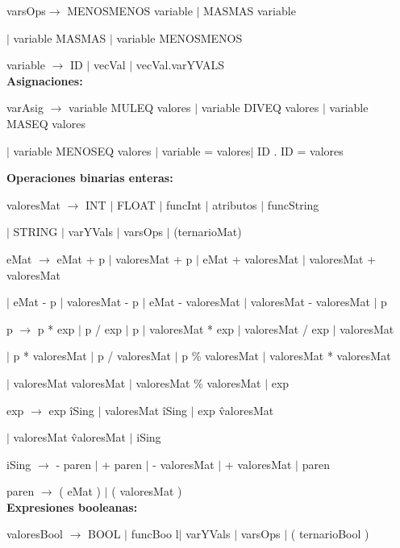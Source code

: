 varsOps$\rightarrow$ MENOSMENOS variable $|$ MASMAS variable

\hspace{15mm}$|$ variable MASMAS $|$ variable MENOSMENOS

variable $\rightarrow$ ID $|$ vecVal $|$ vecVal.varYVALS  \\

\textbf{Asignaciones:} 

  varAsig $\rightarrow$ variable MULEQ valores $|$ variable DIVEQ valores $|$ variable MASEQ valores
  
  \hspace{15mm}$|$ variable MENOSEQ valores $|$ variable = valores$|$ ID . ID = valores 



\textbf{Operaciones binarias enteras:} 

 valoresMat $\rightarrow$ INT $|$ FLOAT $|$ funcInt $|$ atributos $|$ funcString
 
  \hspace{15mm} $|$ STRING $|$ varYVals $|$ varsOps $|$ (ternarioMat)  
  
 
eMat $\rightarrow$ eMat + p $|$ valoresMat + p $|$ eMat + valoresMat $|$ valoresMat + valoresMat
  
  \hspace{15mm} $|$ eMat - p  $|$ valoresMat - p  $|$ eMat - valoresMat $|$ valoresMat - valoresMat $|$ p
  
 p $\rightarrow$ p * exp $|$ p / exp $|$ p  $|$ valoresMat * exp $|$ valoresMat / exp $|$ valoresMat 
 
   \hspace{15mm} $|$ p * valoresMat $|$ p / valoresMat $|$ p \% valoresMat $|$ valoresMat * valoresMat
   
   \hspace{15mm} $|$ valoresMat \/ valoresMat $|$ valoresMat \% valoresMat $|$ exp
    
 exp $\rightarrow$ exp \^ iSing $|$ valoresMat \^ iSing $|$ exp \^ valoresMat
 
 \hspace{15mm} $|$ valoresMat \^ valoresMat $|$ iSing
  
iSing $\rightarrow$ - paren $|$ + paren $|$ - valoresMat $|$ + valoresMat $|$ paren
  
  
 paren $\rightarrow$ ( eMat )  $|$ ( valoresMat ) \\
  
  
\textbf{Expresiones booleanas:} 

valoresBool $\rightarrow$ BOOL $|$ funcBoo l$|$ varYVals $|$ varsOps $|$ (  ternarioBool )  
 
